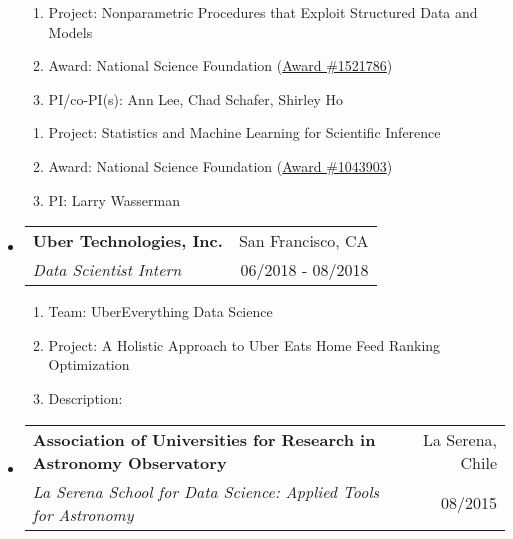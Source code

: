 \documentclass[letterpaper,10pt]{article}
\makeatletter
\newcommand{\subheadingtwo}[4]{
\begin{tabular*}{6.5in}{l@{\cftdotfill{\cftsecdotsep}\extracolsep{\fill}}r}
\textbf{#1} & #2 \\
#3 & {#4} \\
\end{tabular*}}
\makeatother
\begin{document}
\begin{itemize}[leftmargin=0.4cm]
\begin{enumerate}[leftmargin=0.5cm]
	\setlength\itemsep{-0.05ex}
	\item[] Project: Nonparametric Procedures that Exploit Structured Data and Models 
	\item[] Award: National Science Foundation (\href{https://www.nsf.gov/awardsearch/showAward?AWD_ID=1521786}{Award \#1521786})
	\item[] PI/co-PI(s): Ann Lee, Chad Schafer, Shirley Ho
\end{enumerate}


\begin{enumerate}[leftmargin=0.5cm]
	\setlength\itemsep{-0.05ex}
	\item[] Project: Statistics and Machine Learning for Scientific Inference
	\item[] Award: National Science Foundation (\href{https://www.nsf.gov/awardsearch/showAward?AWD_ID=1043903&HistoricalAwards=false}{Award \#1043903})
	\item[] PI: Larry Wasserman
\end{enumerate}


\vspace{0.1cm}


\item[] \subheadingtwo{Uber Technologies, Inc.}{San Francisco, CA}{\it Data Scientist Intern}{06/2018 - 08/2018}


\begin{enumerate}[leftmargin=0.5cm]
	\setlength\itemsep{-0.05ex}
	\item[] Team: UberEverything Data Science
	\item[] Project: A Holistic Approach to Uber Eats Home Feed Ranking Optimization
	\item[] Description:
\vspace{-0.1cm}
{}
\end{enumerate}


\vspace{0.1cm}


\item[] \subheadingtwo{Association of Universities for Research in Astronomy Observatory}{La Serena, Chile}{\it La Serena School for Data Science: Applied Tools for Astronomy}{08/2015}


\end{itemize}
\end{document}
